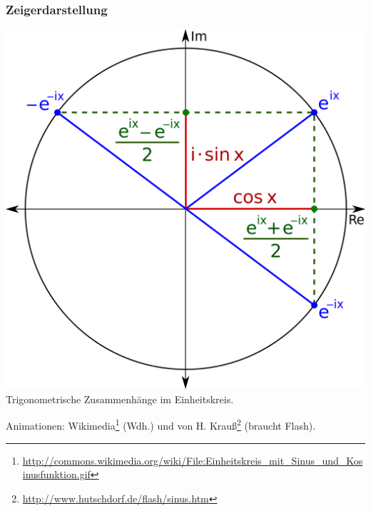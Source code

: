\begin{frame}
    \frametitle{Zeigerdarstellung}

    \begin{center}
        \includegraphics[width=\textwidth,height=0.5\textheight,keepaspectratio]{a11/Sine_Cosine_Exponential_qtl1.png}
        \tiny \hyperlink{refs}{\cite{wc}}\\
        \normalsize Trigonometrische Zusammenhänge im Einheitskreis.
    \end{center}

    Animationen:
    Wikimedia\footnote{\tiny\url{http://commons.wikimedia.org/wiki/File:Einheitskreis_mit_Sinus_und_Kosinusfunktion.gif}}
    (Wdh.) und von H.
    Krauß\footnote{\tiny\url{http://www.hutschdorf.de/flash/sinus.htm}} (braucht
    Flash).

\end{frame}

